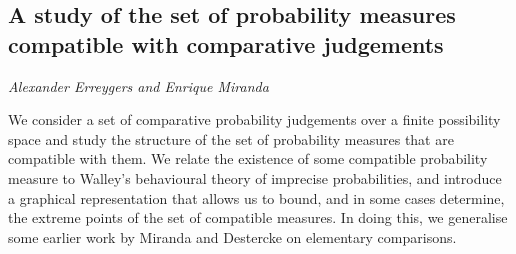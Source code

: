 \documentclass[../booklet.tex]{subfiles}
\begin{document}
\subsection[A study of the set of probability measures compatible with comparative judgements. {\it Alexander Erreygers and Enrique Miranda}]{A study of the set of probability measures compatible with comparative judgements}
 

\begin{center}
  {\it Alexander Erreygers and Enrique Miranda}
\end{center}

\vskip 0.8cm


We consider a set of comparative probability judgements over a finite possibility space and study the structure of the set of probability measures that are compatible with them.
We relate the existence of some compatible probability measure to Walley's behavioural theory of imprecise probabilities, and introduce a graphical representation that allows us to bound, and in some cases determine, the extreme points of the set of compatible measures.
In doing this, we generalise some earlier work by Miranda and Destercke on elementary comparisons.

\end{document}
